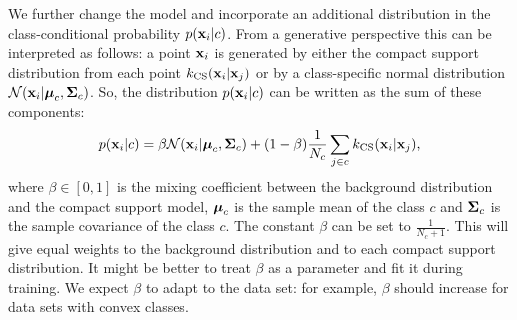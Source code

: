 	We further change the model and incorporate an additional distribution in the class-conditional probability $p(\mathbf{x}_i|c)$. From a generative perspective this can be interpreted as follows: a point $\mathbf{x}_i$ is generated by either the compact support distribution from each point $k_\text{CS}(\mathbf{x}_i|\mathbf{x}_j)$ or by a class-specific normal distribution $\mathcal{N}(\mathbf{x}_i|\mbox{\boldmath $\mu$}_c,\mbox{\boldmath $\Sigma$}_c)$. So, the distribution $p(\mathbf{x}_i|c)$ can be written as the sum of these components:
		\begin{align}
			p(\mathbf{x}_i|c) = \beta \mathcal{N}(\mathbf{x}_i|\mbox{\boldmath $\mu$}_c,\mbox{\boldmath $\Sigma$}_c) + (1-\beta)
	\frac{1}{N_c}\sum_{j\in c} k_\text{CS}(\mathbf{x}_i|\mathbf{x}_j),
			\label{eq:nca-cs-back-1}
		\end{align}
	where $\beta\in[0,1]$ is the mixing coefficient between the background distribution and
	the compact support model, $\mbox{\boldmath $\mu$}_c$ is the sample mean of the class $c$ and $\mbox{\boldmath $\Sigma$}_c$ is the sample
	covariance of the class $c$. The constant $\beta$ can be set to $\frac{1}{N_c+1}$. This will give equal weights to the background distribution and to each compact support distribution. It might be better to treat $\beta$ as a parameter and fit it during training. We expect $\beta$ to adapt to the data set: for example, $\beta$ should increase for data sets with convex classes. 
	
